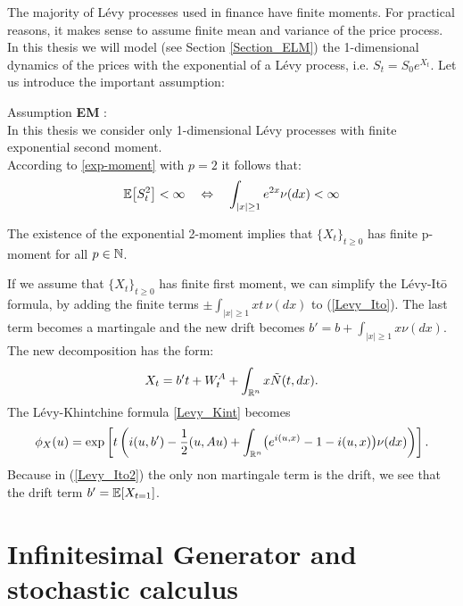 The majority of Lévy processes used in finance have finite moments.
For practical reasons, it makes sense to assume finite mean and variance of the price process.
In this thesis we will model (see Section \ref{Section_ELM}) the 1-dimensional dynamics of the prices with the exponential of a Lévy process, 
i.e. $S_t = S_0 e^{X_t}$. Let us introduce the important assumption:  
\begin{center}
\begin{riquadro}{12cm}
Assumption \textbf{EM}\label{AssumptionEM}  :\\
In this thesis we consider only 1-dimensional Lévy processes with finite exponential second moment.\\
According to \ref{exp-moment} with $p=2$ it follows that:
$$ \mathbb{E}\bigl[ S_t^2 \bigr] < \infty \quad \Leftrightarrow  \quad \int_{|x| \geq 1} e^{2x} \nu(dx) <\infty $$
\end{riquadro}
\end{center}

The existence of the exponential 2-moment implies that $\{X_t\}_{t \geq 0}$ has finite p-moment for all $p \in \mathbb{N}$.


\vspace{1.5em}

If we assume that $\{X_t\}_{t \geq 0}$ has finite first moment, we can simplify the Lévy-It\={o} formula, by adding the finite terms $\pm \int_{|x| \geq 1} x t\, \nu(dx)$ 
to (\ref{Levy_Ito}). The last term becomes a martingale and the new drift becomes $b' = b+\int_{|x| \geq 1} x \nu(dx)$.\\
The new decomposition has the form:
\begin{equation}\label{Levy_Ito2}
 X_t = b't + W^A_t + \int_{\mathbb{R}^n} x \tilde{N}(t,dx).
\end{equation}
The Lévy-Khintchine formula \ref{Levy_Kint} becomes
\begin{equation}\label{Levy_Kint2}
\phi_X(u) = \mbox{exp} \left[ t \left( i(u,b') - \frac{1}{2}(u,Au) + \int_{\mathbb{R}^n} 
	   \bigl( e^{i(u,x)} -1 -i(u,x) \bigr) \nu(dx) \right) \right]. 
\end{equation}
Because in (\ref{Levy_Ito2}) the only non martingale term is the drift, we see that the drift term $b' = \mathbb{E}[ X_{t=1} ]$.


\section{Infinitesimal Generator and stochastic calculus}\label{Infinitesimal_generator_stoch_calc}

